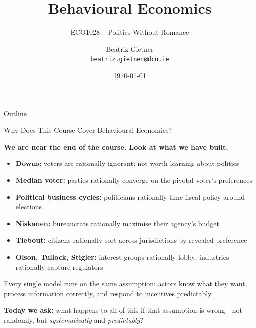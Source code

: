 \documentclass[10pt]{beamer}
\title{Behavioural Economics}
\subtitle{ECO1028 -- Politics Without Romance}
\author{Beatriz Gietner\\
\texttt{beatriz.gietner@dcu.ie}}
\date{\today}
\begin{document}
\maketitle

\begin{frame}{Outline}
\tableofcontents
\end{frame}


\begin{frame}[allowframebreaks]{Why Does This Course Cover Behavioural Economics?}

\textbf{We are near the end of the course. Look at what we have built.}


\begin{itemize}
\item \textbf{Downs:} voters are rationally ignorant; not worth learning about politics
\item \textbf{Median voter:} parties rationally converge on the pivotal voter's preferences
\item \textbf{Political business cycles:} politicians rationally time fiscal policy around elections
\item \textbf{Niskanen:} bureaucrats rationally maximise their agency's budget
\item \textbf{Tiebout:} citizens rationally sort across jurisdictions by revealed preference
\item \textbf{Olson, Tullock, Stigler:} interest groups rationally lobby; industries rationally capture regulators
\end{itemize}


Every single model runs on the same assumption: \alert{actors know what they want, process information correctly, and respond to incentives predictably.}


\textbf{Today we ask:} what happens to all of this if that assumption is wrong - not randomly, but \emph{systematically} and \emph{predictably}?
\end{frame}
\end{document}
